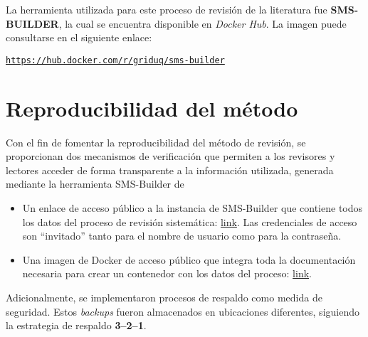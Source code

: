 \noindent
La herramienta utilizada para este proceso de revisión de la literatura fue \textbf{SMS-BUILDER}, la cual se encuentra disponible en \textit{Docker Hub}. La imagen puede consultarse en el siguiente enlace:

\begin{center}
	\href{https://hub.docker.com/r/griduq/sms-builder}{\texttt{https://hub.docker.com/r/griduq/sms-builder}}
\end{center}



\section{Reproducibilidad del método}
\noindent
Con el fin de fomentar la reproducibilidad del método de revisión, se proporcionan dos mecanismos de verificación que permiten a los revisores y lectores acceder de forma transparente a la información utilizada, generada mediante la herramienta SMS-Builder de~\cite{SMSBuilder2020}
\begin{itemize}
	\item Un enlace de acceso público a la instancia de SMS-Builder que contiene todos los datos del proceso de revisión sistemática: \href{https://sms-vbc.iti.grid.uniquindio.edu.co/sms.xhtml}{link}. Las credenciales de acceso son ``invitado'' tanto para el nombre de usuario como para la contraseña.
	\item Una imagen de Docker de acceso público que integra toda la documentación necesaria para crear un contenedor con los datos del proceso: \href{https://hub.docker.com/r/anubis1001/tg-vbc-sms-builder}{link}.
\end{itemize}

\noindent
Adicionalmente, se implementaron procesos de respaldo como medida de seguridad. Estos \textit{backups} fueron almacenados en ubicaciones diferentes, siguiendo la estrategia de respaldo \textbf{3--2--1}.

